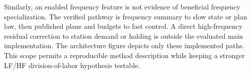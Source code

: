 Similarly, an enabled frequency feature is not evidence of beneficial frequency specialization. The verified pathway is frequency summary to slow state or plan law, then published plans and budgets to fast control. A direct high-frequency residual correction to station demand or holding is outside the evaluated main implementation. The architecture figure depicts only these implemented paths. This scope permits a reproducible method description while keeping a stronger LF/HF division-of-labor hypothesis testable.
